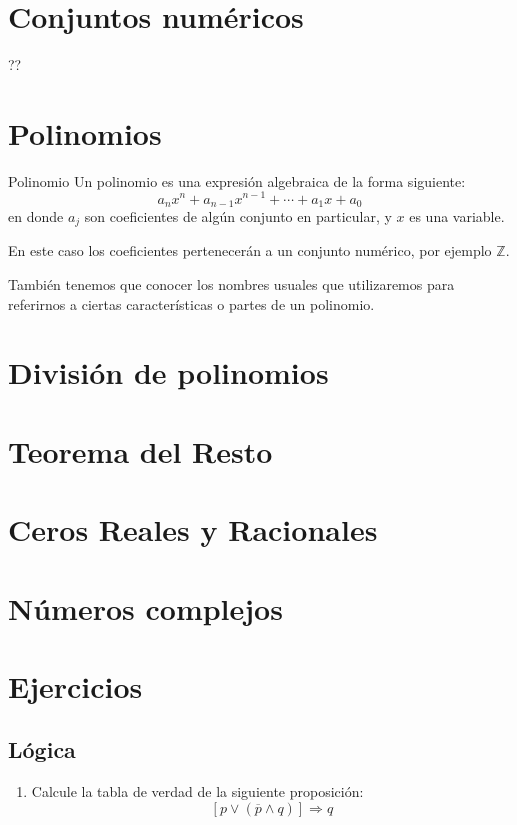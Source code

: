 \documentclass[11pt, twoside]{book}
\begin{document}
\section{Conjuntos numéricos}
??

\section{Polinomios}
\begin{definition}{Polinomio}
    Un polinomio es una expresión algebraica de la forma siguiente:
        \[a_nx^n+a_{n-1}x^{n-1}+\cdots+a_1x+a_0\]
    en donde \(a_j\) son coeficientes de algún conjunto en particular, y \(x\) es una variable.
\end{definition}
En este caso los coeficientes pertenecerán a un conjunto numérico, por ejemplo \(\mathbb{Z}\).

También tenemos que conocer los nombres usuales que utilizaremos para referirnos a ciertas características o partes de un polinomio.
\begin{definition}{}
\end{definition}

\section{División de polinomios}
\section{Teorema del Resto}
\section{Ceros Reales y Racionales}

\section{Números complejos}


\newpage
\section{Ejercicios}
\subsection*{Lógica}
\begin{enumerate}
    \item Calcule la tabla de verdad de la siguiente proposición:
            \[\left[p\vee(\overline{p}\wedge q)\right]\Rightarrow q\]
\end{enumerate}
\end{document}
